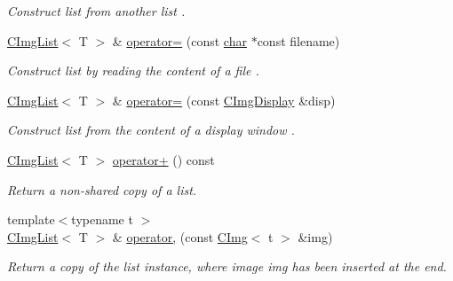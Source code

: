 \begin{Indent}
\begin{DoxyCompactItemize}
\begin{DoxyCompactList}\small\item\em Construct list from another list . \end{DoxyCompactList}\item 
\hyperlink{structcimg__library__suffixed_1_1CImgList}{C\+Img\+List}$<$ T $>$ \& \hyperlink{structcimg__library__suffixed_1_1CImgList_a9db7c51d751bbc507f788dfd1eb63967}{operator=} (const \hyperlink{classchar}{char} $\ast$const filename)
\begin{DoxyCompactList}\small\item\em Construct list by reading the content of a file . \end{DoxyCompactList}\item 
\hyperlink{structcimg__library__suffixed_1_1CImgList}{C\+Img\+List}$<$ T $>$ \& \hyperlink{structcimg__library__suffixed_1_1CImgList_ac8a59666c6750d3fc9eacc362c5c03a9}{operator=} (const \hyperlink{structcimg__library__suffixed_1_1CImgDisplay}{C\+Img\+Display} \&disp)
\begin{DoxyCompactList}\small\item\em Construct list from the content of a display window . \end{DoxyCompactList}\item 
\hyperlink{structcimg__library__suffixed_1_1CImgList}{C\+Img\+List}$<$ T $>$ \hyperlink{structcimg__library__suffixed_1_1CImgList_a7c058427c211ad1dc806bcbd59e7919b}{operator+} () const
\begin{DoxyCompactList}\small\item\em Return a non-\/shared copy of a list. \end{DoxyCompactList}\item 
{\footnotesize template$<$typename t $>$ }\\\hyperlink{structcimg__library__suffixed_1_1CImgList}{C\+Img\+List}$<$ T $>$ \& \hyperlink{structcimg__library__suffixed_1_1CImgList_a42e29470c891aa44dbc3bb21b32b7d1a}{operator,} (const \hyperlink{structcimg__library__suffixed_1_1CImg}{C\+Img}$<$ t $>$ \&img)
\begin{DoxyCompactList}\small\item\em Return a copy of the list instance, where image {\ttfamily img} has been inserted at the end. \end{DoxyCompactList}\item 
\mbox{\label{structcimg__library__suffixed_1_1CImgList_aa242710152fceb05fa4099a2b68240ad}} 

\end{DoxyCompactItemize}
\end{Indent}
